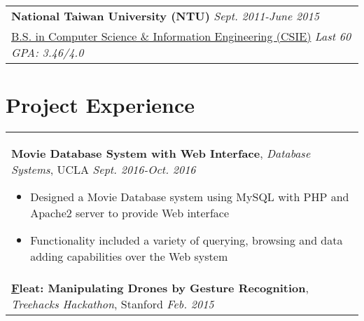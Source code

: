 \documentclass[a4paper,10pt]{article} %
\begin{document}
{\begin{tabular}{p{16cm}}
\vspace{0.5mm}
\textsc \normalsize\textbf{National Taiwan University (NTU)} \hfill  \it{Sept. 2011-June 2015}\\
\href{https://www.csie.ntu.edu.tw}{B.S. in Computer Science \& Information Engineering (CSIE)} 
\hfill \it{Last 60 GPA: 3.46/4.0}\\ 
\end{tabular}


\section{\textbf{Project Experience}}
\begin{tabular}{p{16cm}}

\normalsize\textbf{Movie Database System with Web Interface}, {\it{Database Systems}}, UCLA \hfill {\it Sept. 2016-Oct. 2016}
\vspace{0.5mm}
\begin{itemize}
\item Designed a Movie Database system using MySQL with PHP and Apache2 server to provide Web interface 
\item Functionality included a variety of querying, browsing and data adding capabilities over the Web system\vspace*{-\baselineskip}
\end{itemize} \\
\vspace{0.5mm}

\normalsize\textbf{\href{https://www.youtube.com/watch?v=jxsZaQ6PcXU}Fleat: Manipulating Drones by Gesture Recognition}, {\it{Treehacks Hackathon}}, Stanford \hfill {\it Feb. 2015}


\end{tabular}}
\end{document}
